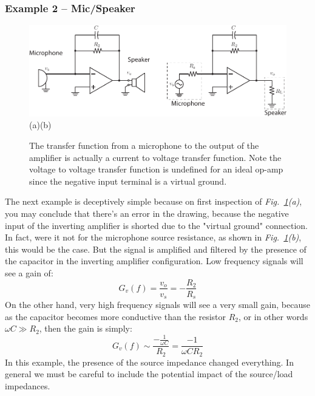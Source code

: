 \subsubsection{Example 2 – Mic/Speaker}
\begin{figure}[tb]
\centering
\includegraphics[width=\columnwidth]{ex_microphone}\\
(a)\hspace{8cm}(b)
\caption{The transfer function from a microphone to the output of the amplifier is actually a current to voltage transfer function.  Note the voltage to voltage transfer function is undefined for an ideal op-amp since the negative input terminal is a virtual ground.}
\label{fig:microphone}
\end{figure}
The next example is deceptively simple because on first inspection of \emph{Fig.~\ref{fig:microphone}(a)}, you may conclude that there's an error in the drawing, because the negative input of the inverting amplifier is shorted due to the "virtual ground" connection.  In fact, were it not for the microphone source resistance, as shown in  \emph{Fig.~\ref{fig:microphone}(b)}, this would be the case. But the signal is amplified and filtered by the presence of the capacitor in the inverting amplifier configuration.
\newpage
\noindent
Low frequency signals will see a gain of:
    \begin{equation}
        G_v(f) = \frac{v_{o}}{v_s } = -\frac{R_2}{R_s}
    \end{equation}
On the other hand, very high frequency signals will see a very small gain, because as the capacitor becomes more conductive than the resistor $R_2$, or in other words $\omega C \gg R_2$, then the gain is simply:
    \begin{equation}
        G_v(f) \sim \frac{-\frac{1}{\omega C}}{R_2 } = \frac{-1}{\omega C R_2 }
    \end{equation}
In this example, the presence of the source impedance changed everything.  In general we must be careful to include the potential impact of the source/load impedances.  

